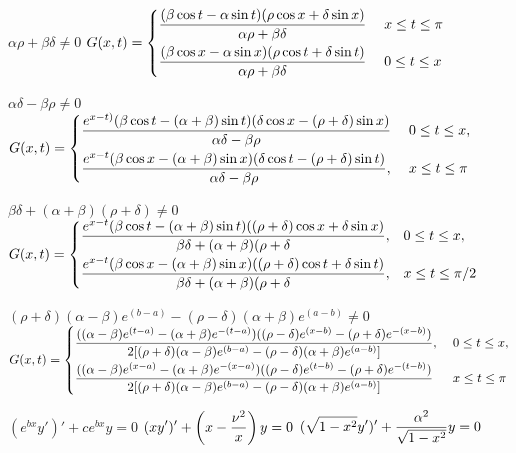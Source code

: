 \smallskip
{} $\alpha\rho+\beta\delta\ne0$ \;
$G(x,t)=
\begin{cases}
\displaystyle{\frac{(\beta\cos t-\alpha\sin t)(\rho\cos x+\delta\sin x)}
{\alpha\rho+\beta\delta}}\;   & x\le t\le \pi  \\[.11in]
\displaystyle{\frac{(\beta\cos x-\alpha\sin x)(\rho\cos t+\delta\sin t)}
{\alpha\rho+\beta\delta}}\;
&0\le t\le x
\end{cases}$

\smallskip
{} $\alpha\delta-\beta\rho\ne0$ \;
$G(x,t)=
\begin{cases}
\displaystyle{\frac{e^{x-t)}(\beta\cos t-(\alpha+\beta)\sin t)
(\delta\cos x-(\rho+\delta)\sin x)}{\alpha\delta-\beta\rho}}\;
&0\le t\le x, \\[.11in]
\displaystyle{\frac{e^{x-t}(\beta\cos x-(\alpha+\beta)\sin x)
(\delta\cos t-(\rho+\delta)\sin t)}{\alpha\delta-\beta\rho}},\;
&x\le t\le \pi
\end{cases}$

\smallskip
{} $\beta \delta+(\alpha+\beta)(\rho+\delta)\ne0$ \;
$G(x,t)=
\begin{cases}
\displaystyle{\frac{e^{x-t}(\beta\cos t-(\alpha+\beta)\sin t)
((\rho+\delta)\cos x+\delta \sin x)}
{\beta \delta+(\alpha+\beta)(\rho+\delta}},& 0\le t\le  x, \\[.11in]
\displaystyle{\frac{e^{x-t}(\beta\cos x-(\alpha+\beta)\sin x)
((\rho+\delta)\cos t+\delta \sin t)}
{\beta \delta+(\alpha+\beta)(\rho+\delta}},  &x\le t\le \pi/2
\end{cases}$

\smallskip
{}
$(\rho+\delta)(\alpha-\beta)e^{(b-a)}-(\rho-\delta)(\alpha+\beta)e^{(a-b)}\ne0$
$G(x,t)=
\begin{cases}
\displaystyle{\frac{((\alpha-\beta)e^{(t-a)}-(\alpha+\beta)e^{-(t-a)})
((\rho-\delta)e^{(x-b)}-(\rho+\delta)e^{-(x-b)})}
{2[(\rho+\delta)(\alpha-\beta)e^{(b-a)}-(\rho-\delta)(\alpha+\beta)e^{(a-b)}]}},\;
&0\le t\le x,\\[.11in]
\displaystyle{\frac{((\alpha-\beta)e^{(x-a)}-(\alpha+\beta)e^{-(x-a)})
((\rho-\delta)e^{(t-b)}-(\rho+\delta)e^{-(t-b)})}
{2[(\rho+\delta)(\alpha-\beta)e^{(b-a)}-(\rho-\delta)(\alpha+\beta)e^{(a-b)}]}}\;
&x\le t\le \pi
\end{cases}$




 $(e^{bx}y')'+ce^{bx}y=0$\;
 $\displaystyle{(xy')'+\left(x-\frac{\nu^{2}}{x}\right)y=0}$\;
 $\displaystyle{(\sqrt{1-x^{2}}y')'+\frac{\alpha^{2}}{\sqrt{1-x^{2}}}y=0}$

